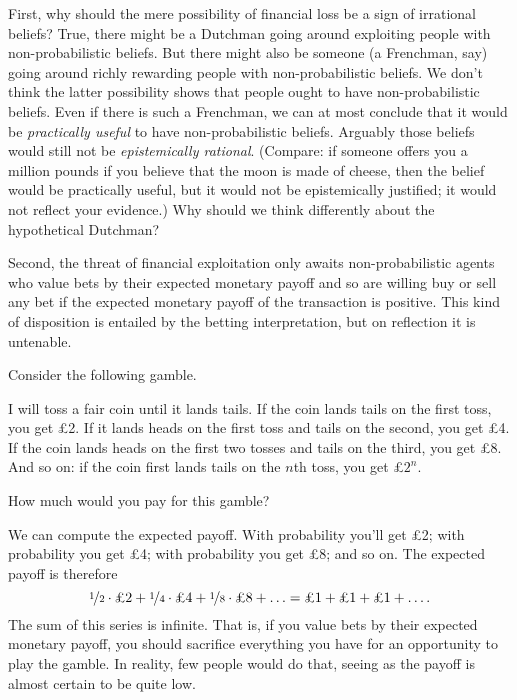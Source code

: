 First, why should the mere possibility of financial loss be a sign of
irrational beliefs? True, there might be a Dutchman going around
exploiting people with non-probabilistic beliefs. But there might also
be someone (a Frenchman, say) going around richly rewarding people
with non-probabilistic beliefs. We don't think the latter possibility
shows that people ought to have non-probabilistic beliefs. Even if
there is such a Frenchman, we can at most conclude that it would be
\emph{practically useful} to have non-probabilistic beliefs. Arguably
those beliefs would still not be \emph{epistemically
  rational}. (Compare: if someone offers you a million pounds if you
believe that the moon is made of cheese, then the belief would be
practically useful, but it would not be epistemically justified;
it would not reflect your evidence.) Why should we think
differently about the hypothetical Dutchman? 

Second, the threat of financial exploitation only awaits non-probabilistic
agents who value bets by their expected monetary payoff and so are willing buy
or sell any bet if the expected monetary payoff of the transaction is
positive. This kind of disposition is entailed by the betting interpretation,
but on reflection it is untenable.

Consider the following gamble.
\begin{example}
  I will toss a fair coin until it lands tails. If the coin lands tails on
  the first toss, you get £2. If it lands heads on the first
  toss and tails on the second, you get £4. If the coin lands heads on the
  first two tosses and tails on the third, you get £8. And so on: if
  the coin first lands tails on the $n$th toss, you get £$2^n$.
\end{example}
How much would you pay for this gamble? 

We can compute the expected payoff. With probability 
you'll get £2; with probability  you get £4; with
probability  you get £8; and so on. The expected payoff
is therefore
\[
  \nicefrac{1}{2} \cdot \text{£2} + 
  \nicefrac{1}{4} \cdot \text{£4} + 
  \nicefrac{1}{8} \cdot \text{£8} + 
  \ldots = \text{£1} +  \text{£1} +  \text{£1} + \ldots. 
\]
The sum of this series is infinite. That is, if you value bets by
their expected monetary payoff, you should sacrifice everything you
have for an opportunity to play the gamble. In reality, few people
would do that, seeing as the payoff is almost certain to be quite low.

